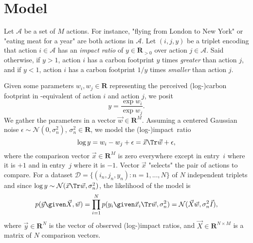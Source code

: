 \section{Model}%
\label{sec:model}

Let $ \mathcal{A} $ be a set of $M$ actions.
For instance, "flying from London to New York" or "eating meat for a year" are both actions in $ \mathcal{A}$.
Let $ (i, j, y) $ be a triplet encoding that action $i \in \mathcal{A}$ has an \textit{impact ratio} of $y \in \mathbf{R}_{>0}$ over action $j \in \mathcal{A}$.
Said otherwise, if $y > 1$, action $i$ has a carbon footprint $y$ times \textit{greater} than action $j$, and if $y < 1$, action $i$ has a carbon footprint $1/y$ times \textit{smaller} than action $j$.

Given some parameters $w_i, w_j \in \mathbf{R}$ representing the perceived (log-)carbon footprint in \COtwo-equivalent of action $i$ and action $j$, we posit
\begin{equation*}
	y = \frac{\exp w_i}{\exp w_j}.
\end{equation*}
We gather the parameters in a vector $\vec{w} \in \mathbf{R}^M$.
Assuming a centered Gaussian noise $\epsilon \sim \mathcal{N}(0, \sigma^2_n)$, $\sigma_n^2 \in \mathbf{R}$, we model the (log-)impact~ratio
\begin{equation}
	\log y = w_i - w_j + \epsilon = \vec{x}\Tr\vec{w} + \epsilon,
\end{equation}
where the comparison vector $\vec{x} \in \mathbf{R}^M$ is zero everywhere except in entry~$i$ where it is $+1$ and in entry~$j$ where it is $-1$.
Vector $\vec{x}$ "selects" the pair of actions to compare.
For a dataset $ \mathcal{D} = \{ (i_n, j_n, y_n) : n = 1, ..., N \}$ of $N$ independent triplets and since \mbox{$\log y \sim \mathcal{N}(\vec{x}\Tr \vec{w}, \sigma^2_n)$}, the likelihood of the model is
\begin{equation*}
	p(\vec{y} \given \vec{X}, \vec{w}) = \prod_{i=1}^N p(y_i \given \vec{x}_i\Tr \vec{w}, \sigma_n^2) = \mathcal{N}(\vec{X} \vec{w}, \sigma_n^2\vec{I}),
\end{equation*}
where $\vec{y} \in \mathbf{R}^N$ is the vector of observed (log-)impact ratios, and $\vec{X} \in \mathbf{R}^{N \times M}$ is a matrix of $N$ comparison vectors.

